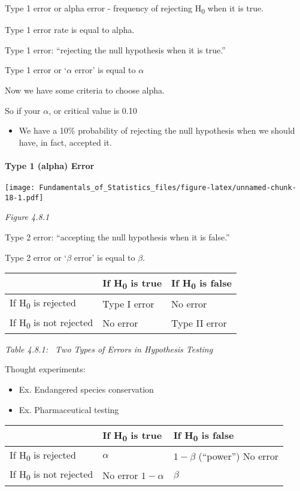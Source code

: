 \documentclass[]{article}
\providecommand{\tightlist}{%
  \setlength{\itemsep}{0pt}\setlength{\parskip}{0pt}}
\let\oldparagraph\paragraph
\renewcommand{\paragraph}[1]{\oldparagraph{#1}\mbox{}}
\begin{document}
Type 1 error or alpha error - frequency of rejecting H\textsubscript{0}
when it is true.

Type 1 error rate is equal to alpha.

Type 1 error: ``rejecting the null hypothesis when it is true.''

Type 1 error or `\(\alpha\) error' is equal to \(\alpha\)

Now we have some criteria to choose alpha.

So if your \(\alpha\), or critical value is 0.10

\begin{itemize}
\tightlist
\item
  We have a 10\% probability of rejecting the null hypothesis when we
  should have, in fact, accepted it.
\end{itemize}

\hypertarget{type-1-alpha-error}{%
\paragraph{Type 1 (alpha) Error}\label{type-1-alpha-error}}

\texttt{[image: Fundamentals\_of\_Statistics\_files/figure-latex/unnamed-chunk-18-1.pdf]}

\emph{Figure 4.8.1}

Type 2 error: ``accepting the null hypothesis when it is false.''

Type 2 error or `\(\beta\) error' is equal to \(\beta\).

\begin{longtable}[]{@{}lll@{}}
\toprule
& If H\textsubscript{0} is true & If H\textsubscript{0} is
false\tabularnewline
\midrule
\endhead
If H\textsubscript{0} is rejected & Type I error & No
error\tabularnewline
If H\textsubscript{0} is not rejected & No error & Type II
error\tabularnewline
\bottomrule
\end{longtable}

\emph{Table 4.8.1: ~Two Types of Errors in Hypothesis Testing}

Thought experiments:

\begin{itemize}
\tightlist
\item
  Ex. Endangered species conservation
\item
  Ex. Pharmaceutical testing
\end{itemize}

\begin{longtable}[]{@{}lll@{}}
\toprule
& If H\textsubscript{0} is true & If H\textsubscript{0} is
false\tabularnewline
\midrule
\endhead
If H\textsubscript{0} is rejected & \(\alpha\) & \(1-\beta\) (``power'')
No error\tabularnewline
If H\textsubscript{0} is not rejected & No error \(1-\alpha\) &
\(\beta\)\tabularnewline
\bottomrule
\end{longtable}
\end{document}
